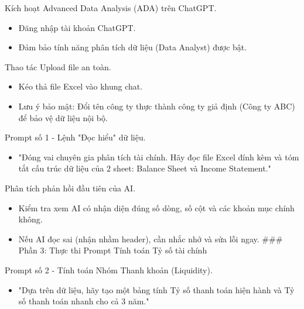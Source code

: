 \documentclass[aspectratio=169]{beamer}
\begin{document}
\begin{frame}{Kích hoạt Advanced Data Analysis (ADA) trên ChatGPT.}
    \begin{itemize}
        \item Đăng nhập tài khoản ChatGPT.
        \item Đảm bảo tính năng phân tích dữ liệu (Data Analyst) được bật.
    \end{itemize}
\end{frame}


\begin{frame}{Thao tác Upload file an toàn.}
    \begin{itemize}
        \item Kéo thả file Excel vào khung chat.
        \item Lưu ý bảo mật: Đổi tên công ty thực thành công ty giả định (Công ty ABC) để bảo vệ dữ liệu nội bộ.
    \end{itemize}
\end{frame}


\begin{frame}{Prompt số 1 - Lệnh "Đọc hiểu" dữ liệu.}
    \begin{itemize}
        \item "Đóng vai chuyên gia phân tích tài chính. Hãy đọc file Excel đính kèm và tóm tắt cấu trúc dữ liệu của 2 sheet: Balance Sheet và Income Statement."
    \end{itemize}
\end{frame}


\begin{frame}{Phân tích phản hồi đầu tiên của AI.}
    \begin{itemize}
        \item Kiểm tra xem AI có nhận diện đúng số dòng, số cột và các khoản mục chính không.
        \item Nếu AI đọc sai (nhận nhầm header), cần nhắc nhở và sửa lỗi ngay.
        ### Phần 3: Thực thi Prompt Tính toán Tỷ số tài chính
    \end{itemize}
\end{frame}


\begin{frame}{Prompt số 2 - Tính toán Nhóm Thanh khoản (Liquidity).}
    \begin{itemize}
        \item "Dựa trên dữ liệu, hãy tạo một bảng tính Tỷ số thanh toán hiện hành và Tỷ số thanh toán nhanh cho cả 3 năm."
    \end{itemize}
\end{frame}
\end{document}
